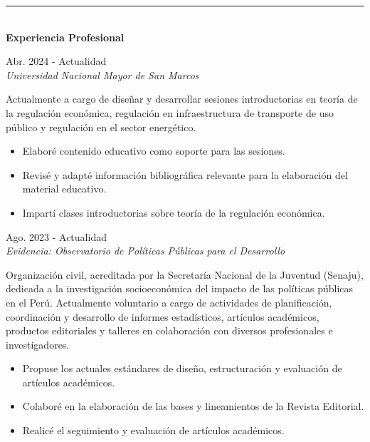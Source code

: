 \documentclass{resume}
\begin{document}
{\color{vino} \noindent \rule{\textwidth}{1pt}} \\
{\color{vino} \noindent \faBriefcase \; {\large \bf Experiencia Profesional}}
\vspace{3pt}

 \hfill {Abr. 2024 - Actualidad} \\
{\it Universidad Nacional Mayor de San Marcos}
\vspace{3pt}

\noindent Actualmente a cargo de diseñar y desarrollar sesiones introductorias en teoría de la regulación económica,
regulación en infraestructura de transporte de uso público y regulación en el sector energético.
\begin{itemize}[noitemsep,topsep=3pt]
	\item Elaboré contenido educativo como soporte para las sesiones.
	\item Revisé y adapté información bibliográfica relevante para la elaboración del material educativo.
	\item Impartí clases introductorias sobre teoría de la regulación económica.
\end{itemize}

 \hfill {Ago. 2023 - Actualidad} \\
{\it Evidencia: Observatorio de Políticas Públicas para el Desarrollo}
\vspace{3pt}

\noindent Organización civil, acreditada por la Secretaría Nacional de la Juventud (Senaju), dedicada a la investigación socioeconómica del impacto de las políticas públicas en el Perú.
Actualmente voluntario a cargo de actividades de planificación, coordinación y desarrollo de informes estadísticos,
artículos académicos, productos editoriales y talleres en colaboración con diversos profesionales e investigadores.
\begin{itemize}[noitemsep,topsep=3pt]
	\item Propuse los actuales estándares de diseño, estructuración y evaluación de artículos académicos.
	\item Colaboré en la elaboración de las bases y lineamientos de la Revista Editorial.
	\item Realicé el seguimiento y evaluación de artículos académicos.
\end{itemize}

\end{document}

